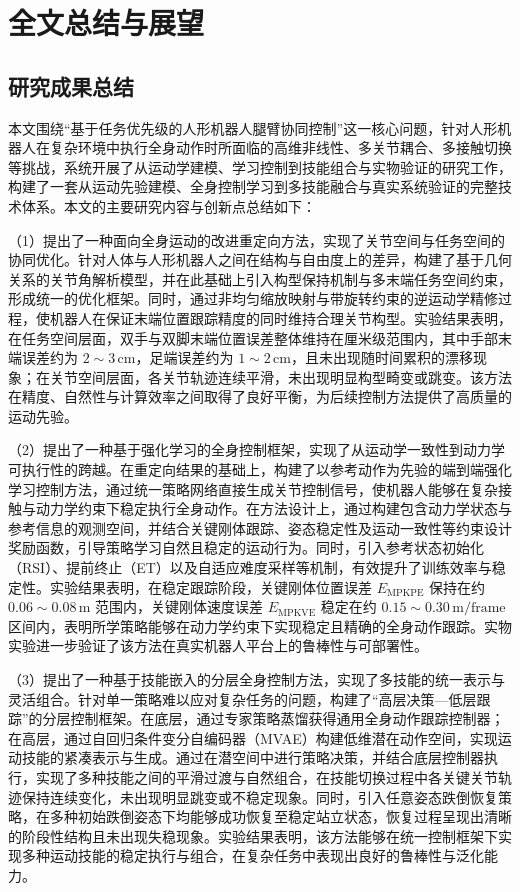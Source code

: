 \chapter{全文总结与展望}


\section{研究成果总结}

本文围绕“基于任务优先级的人形机器人腿臂协同控制”这一核心问题，针对人形机器人在复杂环境中执行全身动作时所面临的高维非线性、多关节耦合、多接触切换等挑战，系统开展了从运动学建模、学习控制到技能组合与实物验证的研究工作，构建了一套从运动先验建模、全身控制学习到多技能融合与真实系统验证的完整技术体系。本文的主要研究内容与创新点总结如下：

（1）提出了一种面向全身运动的改进重定向方法，实现了关节空间与任务空间的协同优化。针对人体与人形机器人之间在结构与自由度上的差异，构建了基于几何关系的关节角解析模型，并在此基础上引入构型保持机制与多末端任务空间约束，形成统一的优化框架。同时，通过非均匀缩放映射与带旋转约束的逆运动学精修过程，使机器人在保证末端位置跟踪精度的同时维持合理关节构型。实验结果表明，在任务空间层面，双手与双脚末端位置误差整体维持在厘米级范围内，其中手部末端误差约为 $2\sim3\,\mathrm{cm}$，足端误差约为 $1\sim2\,\mathrm{cm}$，且未出现随时间累积的漂移现象；在关节空间层面，各关节轨迹连续平滑，未出现明显构型畸变或跳变。该方法在精度、自然性与计算效率之间取得了良好平衡，为后续控制方法提供了高质量的运动先验。

（2）提出了一种基于强化学习的全身控制框架，实现了从运动学一致性到动力学可执行性的跨越。在重定向结果的基础上，构建了以参考动作为先验的端到端强化学习控制方法，通过统一策略网络直接生成关节控制信号，使机器人能够在复杂接触与动力学约束下稳定执行全身动作。在方法设计上，通过构建包含动力学状态与参考信息的观测空间，并结合关键刚体跟踪、姿态稳定性及运动一致性等约束设计奖励函数，引导策略学习自然且稳定的运动行为。同时，引入参考状态初始化（RSI）、提前终止（ET）以及自适应难度采样等机制，有效提升了训练效率与稳定性。实验结果表明，在稳定跟踪阶段，关键刚体位置误差 $E_{\mathrm{MPKPE}}$ 保持在约 $0.06\sim0.08\,\mathrm{m}$ 范围内，关键刚体速度误差 $E_{\mathrm{MPKVE}}$ 稳定在约 $0.15\sim0.30\,\mathrm{m/frame}$ 区间内，表明所学策略能够在动力学约束下实现稳定且精确的全身动作跟踪。实物实验进一步验证了该方法在真实机器人平台上的鲁棒性与可部署性。


（3）提出了一种基于技能嵌入的分层全身控制方法，实现了多技能的统一表示与灵活组合。针对单一策略难以应对复杂任务的问题，构建了“高层决策—低层跟踪”的分层控制框架。在底层，通过专家策略蒸馏获得通用全身动作跟踪控制器；在高层，通过自回归条件变分自编码器（MVAE）构建低维潜在动作空间，实现运动技能的紧凑表示与生成。通过在潜空间中进行策略决策，并结合底层控制器执行，实现了多种技能之间的平滑过渡与自然组合，在技能切换过程中各关键关节轨迹保持连续变化，未出现明显跳变或不稳定现象。同时，引入任意姿态跌倒恢复策略，在多种初始跌倒姿态下均能够成功恢复至稳定站立状态，恢复过程呈现出清晰的阶段性结构且未出现失稳现象。实验结果表明，该方法能够在统一控制框架下实现多种运动技能的稳定执行与组合，在复杂任务中表现出良好的鲁棒性与泛化能力。

